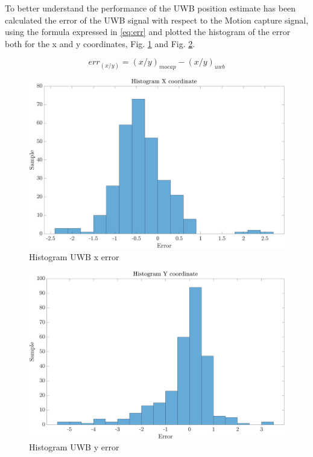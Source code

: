 \documentclass[journal]{IEEEtran}
\begin{document}
To better understand the performance of the UWB position estimate has been calculated the error of the UWB signal with respect to the Motion capture signal, using the formula expressed in \ref{eq:err} and plotted the histogram of the error both for the x and y coordinates, Fig. \ref{fig:hist_x} and Fig. \ref{fig:hist_y}.

\begin{equation}
    err_{(x/y)} = (x/y)_{mocap} - (x/y)_{uwb}
    \label{eq:err}
\end{equation}

\begin{figure}
    \centering
    \includegraphics[scale=0.22]{Images/uwb_test/x_hist_uwb.png}
    \caption{Histogram UWB x error}
    \label{fig:hist_x}
\end{figure}

\begin{figure}
    \centering
    \includegraphics[scale=0.22]{Images/uwb_test/y_hist_uwb.png}
    \caption{Histogram UWB y error}
    \label{fig:hist_y}
\end{figure}
\end{document}
